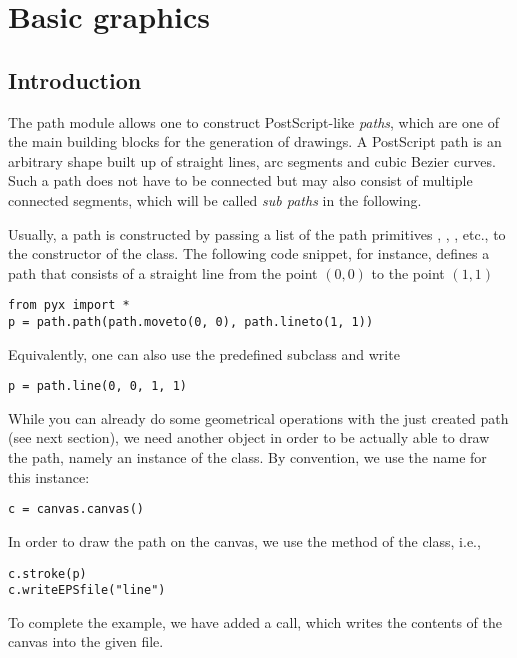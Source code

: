 \chapter{Basic graphics}


\label{graphics}

\section{Introduction}

The path module allows one to construct PostScript-like
\textit{paths}, which are one of the main building blocks for the
generation of drawings. A PostScript path is an arbitrary shape built
up of straight lines, arc segments and cubic Bezier curves. Such a
path does not have to be connected but may also consist of multiple
connected segments, which will be called \textit{sub paths} in the
following.

Usually, a path is constructed by passing a list of the path
primitives , , , etc., to the
constructor of the  class. The following code snippet, for
instance, defines a path  that consists of a straight line
from the point $(0, 0)$ to the point $(1, 1)$
\begin{verbatim}
from pyx import *
p = path.path(path.moveto(0, 0), path.lineto(1, 1))
\end{verbatim}
Equivalently, one can also use the predefined  subclass
 and write
\begin{verbatim}
p = path.line(0, 0, 1, 1)
\end{verbatim}

While you can already do some geometrical operations with the
just created path (see next section), we need another \PyX{} object
in order to be actually able to draw the path, namely
an instance of the  class. By convention, we use
the name  for this instance:
\begin{verbatim}
c = canvas.canvas()
\end{verbatim}
In order to draw the path on the canvas, we use the  method
of the  class, i.e.,
\begin{verbatim}
c.stroke(p)
c.writeEPSfile("line")
\end{verbatim}
To complete the example, we have added a  call,
which writes the contents of the canvas into the given file.

